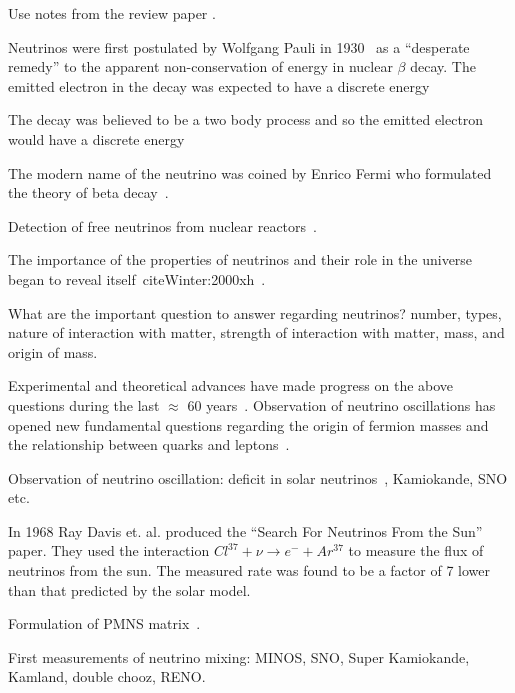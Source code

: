 
Use notes from the review paper \cite{LBNReview_Rubbia}.




Neutrinos were first postulated by Wolfgang Pauli in
1930~\cite{pauli1930letter} as a ``desperate remedy'' to the apparent
non-conservation of energy in nuclear $\beta$ decay. The emitted
electron in the decay was expected to have a discrete energy 

The decay was believed
to be a two body process and so the emitted electron would have a
discrete energy



The modern name of the neutrino was coined by Enrico Fermi who
formulated the theory of beta decay~\cite{Fermi:1934}.

Detection of free neutrinos from nuclear
reactors~\cite{Reines:1956rs}.

The importance of the properties of neutrinos and their role in the
universe began to reveal itself~cite{Winter:2000xh}~\cite{Kolb:1990vq}.


What are the important question to answer regarding neutrinos? number,
types, nature of interaction with matter, strength of interaction with
matter, mass, and origin of mass.

Experimental and theoretical advances have made progress on the above
questions during the last $\approx$ 60 years~\cite{pdg}. Observation of
neutrino oscillations has opened new fundamental questions regarding
the origin of fermion masses and the relationship between quarks and
leptons~\cite{Mohapatra:2005wg}. 


Observation of neutrino oscillation: deficit in solar
neutrinos~\cite{Davis:PhysRevLett.20.1205}, Kamiokande, SNO etc. 

In 1968 Ray Davis et. al. produced the ``Search For Neutrinos From the
Sun'' paper. They used the interaction $Cl^{37}+\nu \rightarrow e^- +
Ar^{37}$ to measure the flux of neutrinos from the sun. The measured
rate was found to be a factor of 7 lower than that predicted by the
solar model.~\cite{Davis:PhysRevLett.20.1205}

Formulation of PMNS
matrix~\cite{Pontecorvo:1967fh, Gribov:1968kq, Maki:1962mu}. 


First measurements of neutrino mixing: MINOS, SNO, Super Kamiokande,
Kamland, double chooz, RENO.



